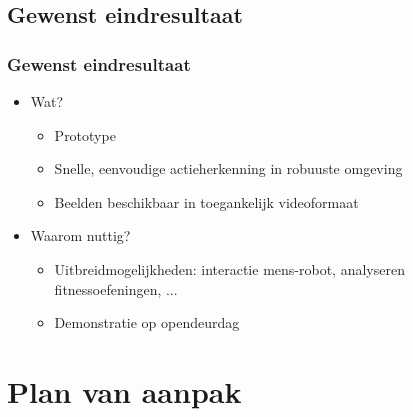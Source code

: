 \documentclass[]{beamer}
\begin{document}
	\subsection{Gewenst eindresultaat}	
	\begin{frame}
	\frametitle{Gewenst eindresultaat}
		\begin{itemize}
			\item<1- > Wat? 
				\begin{itemize}
				\item<1- > Prototype
				\item<1- > Snelle, eenvoudige actieherkenning in robuuste omgeving
				\item<1- > Beelden beschikbaar in toegankelijk videoformaat
				\end{itemize}
			\item<2- > Waarom nuttig?
				\begin{itemize}
				\item<2- > Uitbreidmogelijkheden: interactie mens-robot, analyseren fitnessoefeningen, ...
				\item<2- > Demonstratie op opendeurdag
				\end{itemize}
			
		\end{itemize}
	\end{frame}

	\section{Plan van aanpak}
\end{document}
